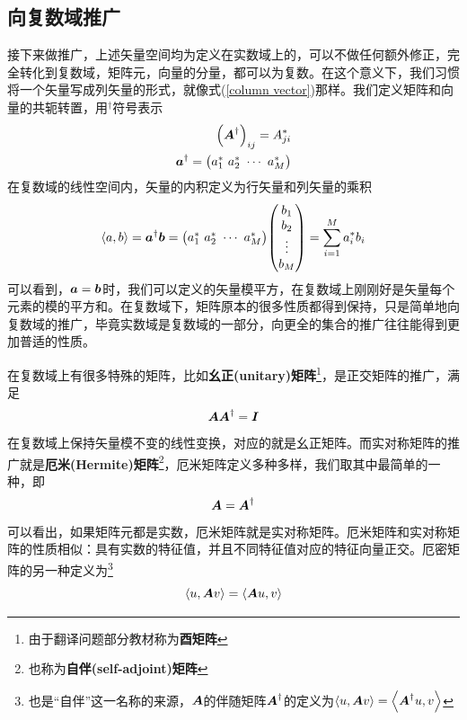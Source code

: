 \documentclass[12pt,a4paper,openany,twoside]{book}
\numberwithin{equation}{section}
\newcommand{\mean}[1]{\left\langle #1 \right\rangle}
\begin{document}
          \subsection{向复数域推广}
            接下来做推广，上述矢量空间均为定义在实数域上的，可以不做任何额外修正，完全转化到复数域，矩阵元，向量的分量，都可以为复数。在这个意义下，我们习惯将一个矢量写成列矢量的形式，就像式(\ref{column vector})那样。我们定义矩阵和向量的共轭转置，用$^\dagger$符号表示
            \begin{equation}
              \begin{aligned}
                \qty(\vb*{A}^\dagger)_{i j}=A_{j i}^* \\
                \vb*{a}^\dagger=\mqty(a_1^*\ a_2^*\ \cdots\ a_M^*)
              \end{aligned}
            \end{equation}
            在复数域的线性空间内，矢量的内积定义为行矢量和列矢量的乘积
            \begin{equation}
              \mean{a,b}=\vb*{a}^\dagger\vb*{b}=\mqty(a_1^*\ a_2^*\ \cdots\ a_M^*) \mqty(
                b_1 \\
                b_2 \\
                \vdots \\
                b_M
              )=\sum_{i=1}^M{a_i^* b_i}
              \label{inner product in row and column }
            \end{equation}
            可以看到，$\vb*{a}=\vb*{b}$时，我们可以定义的矢量模平方，在复数域上刚刚好是矢量每个元素的模的平方和。在复数域下，矩阵原本的很多性质都得到保持，只是简单地向复数域的推广，毕竟实数域是复数域的一部分，向更全的集合的推广往往能得到更加普适的性质。

            在复数域上有很多特殊的矩阵，比如\textbf{幺正(unitary)矩阵}\footnote{由于翻译问题部分教材称为\textbf{酉矩阵}}，是正交矩阵的推广，满足
            \begin{equation}
              \vb*{A}\vb*{A}^\dagger=\vb*{I}
              \label{unitary def}
            \end{equation}
            在复数域上保持矢量模不变的线性变换，对应的就是幺正矩阵。而实对称矩阵的推广就是\textbf{厄米(Hermite)矩阵}\footnote{也称为\textbf{自伴(self-adjoint)矩阵}}，厄米矩阵定义多种多样，我们取其中最简单的一种，即
            \begin{equation}
              \vb*{A}=\vb*{A}^{\dagger}
            \end{equation}
            可以看出，如果矩阵元都是实数，厄米矩阵就是实对称矩阵。厄米矩阵和实对称矩阵的性质相似：具有实数的特征值，并且不同特征值对应的特征向量正交。厄密矩阵的另一种定义为\footnote{也是“自伴”这一名称的来源，$\vb*{A}$的伴随矩阵$\vb*{A}^\dagger$的定义为$\mean{u,\vb*{A}v}=\mean{\vb*{A}^\dagger u,v}$}
            \begin{equation}
              \mean{u,\vb*{A}v}=\mean{\vb*{A}u,v}
            \end{equation}
\end{document}
